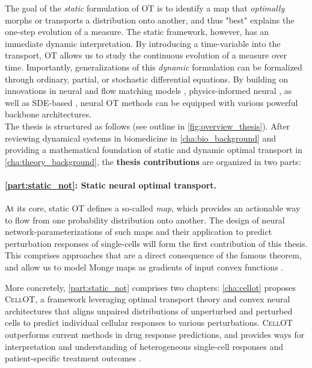 The goal of the \emph{static} formulation of OT is to identify a map that \emph{optimally} morphs or transports a distribution onto another, and thus "best" explains the one-step evolution of a measure.
The static framework, however, has an immediate dynamic interpretation. By introducing a time-variable into the transport, OT allows us to study the continuous evolution of a measure over time. %
Importantly, generalizations of this \emph{dynamic} formulation can be formalized through ordinary, partial, or stochastic differential equations. By building on innovations in neural  \citep{chen2018neural} and flow matching models \citep{lipman2023flow, pooladian2023multisample, liu2022flow}, physics-informed neural  \citep{brandstetter2022message, raissi2019physics}, as well as \acrfull{SDE}-based , neural OT methods can be equipped with various powerful backbone architectures. \\

The thesis is structured as follows (see outline in \cref{fig:overview_thesis}).
After reviewing dynamical systems in biomedicine in \cref{cha:bio_background} and providing a mathematical foundation of static and dynamic optimal transport in \cref{cha:theory_background}, the \textbf{thesis contributions} are organized in two parts:

\paragraph{\cref{part:static_not}: Static neural optimal transport.}

At its core, static OT defines a so-called \citeauthor{monge1781histoire} \textit{map}, which provides an actionable way to flow from one probability distribution onto another.
The design of neural network-parameterizations of such maps and their application to predict perturbation responses of single-cells will form the first contribution of this thesis.
This comprises approaches that are a direct consequence of the famous \citeauthor{brenier1987decomposition} theorem, and allow us to model Monge maps as gradients of input convex functions \citep{bunne2021learning, bunne2022supervised}.

More concretely, \cref{part:static_not} comprises two chapters:
\cref{cha:cellot} proposes \textsc{CellOT}, a framework leveraging optimal transport theory and convex neural architectures that aligns unpaired distributions of unperturbed and perturbed cells to predict individual cellular responses to various perturbations. 
\textsc{CellOT} outperforms current methods in drug response predictions, and provides ways for interpretation and understanding of heterogeneous single-cell responses and patient-specific treatment outcomes \citep{bunne2021learning}. 


